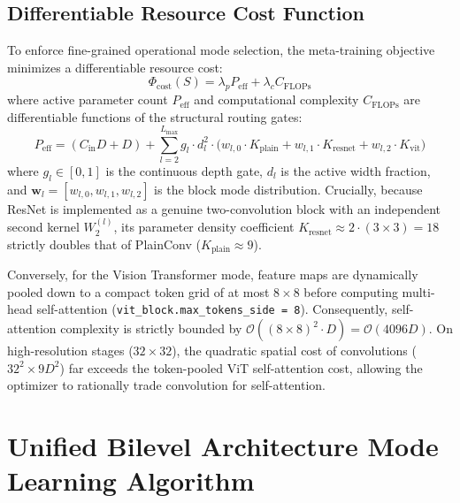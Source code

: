 \documentclass[11pt, a4paper]{article}
\begin{document}
\subsection{Differentiable Resource Cost Function}
\label{sec:phi_cost}

To enforce fine-grained operational mode selection, the meta-training objective minimizes a differentiable resource cost:
\begin{equation}
    \Phi_{\text{cost}}(S) = \lambda_p P_{\text{eff}} + \lambda_c C_{\text{FLOPs}}
    \label{eq:cost_model}
\end{equation}
where active parameter count $P_{\text{eff}}$ and computational complexity $C_{\text{FLOPs}}$ are differentiable functions of the structural routing gates:
\begin{equation}
    P_{\text{eff}} = (C_{\text{in}} D + D) + \sum_{l=2}^{L_{\max}} g_l \cdot d_l^2 \cdot \Big( w_{l, 0} \cdot K_{\text{plain}} + w_{l, 1} \cdot K_{\text{resnet}} + w_{l, 2} \cdot K_{\text{vit}} \Big)
    \label{eq:param_counting}
\end{equation}
where $g_l \in [0, 1]$ is the continuous depth gate, $d_l$ is the active width fraction, and $\mathbf{w}_l = [w_{l, 0}, w_{l, 1}, w_{l, 2}]$ is the block mode distribution. Crucially, because ResNet is implemented as a genuine two-convolution block with an independent second kernel $W_2^{(l)}$, its parameter density coefficient $K_{\text{resnet}} \approx 2 \cdot (3\times 3) = 18$ strictly doubles that of PlainConv ($K_{\text{plain}} \approx 9$). 

Conversely, for the Vision Transformer mode, feature maps are dynamically pooled down to a compact token grid of at most $8{\times}8$ before computing multi-head self-attention (\texttt{vit\_block.}\allowbreak\texttt{max\_tokens\_side = 8}). Consequently, self-attention complexity is strictly bounded by $\mathcal{O}((8\times 8)^2 \cdot D) = \mathcal{O}(4096 D)$. On high-resolution stages ($32\times 32$), the quadratic spatial cost of convolutions ($32^2 \times 9 D^2$) far exceeds the token-pooled ViT self-attention cost, allowing the optimizer to rationally trade convolution for self-attention.

\section{Unified Bilevel Architecture Mode Learning Algorithm}
\label{sec:algorithm}
\end{document}
